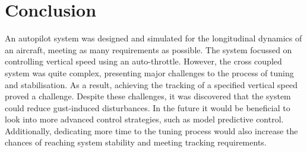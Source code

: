 \documentclass{UoNMCHA}
\numberwithin{equation}{section}
\begin{document}
\newpage
\section{Conclusion}
An autopilot system was designed and simulated for the longitudinal dynamics of an aircraft, meeting as many requirements as possible. The system focussed on controlling vertical speed using an auto-throttle. However, the cross coupled system was quite complex, presenting major challenges to the process of tuning and stabilisation. As a result, achieving the tracking of a specified vertical speed proved a challenge. Despite these challenges, it was discovered that the system could reduce gust-induced disturbances.
In the future it would be beneficial to look into more advanced control strategies, such as model predictive control. Additionally, dedicating more time to the tuning process would also increase the chances of reaching system stability and meeting tracking requirements.

\newpage

\end{document}
